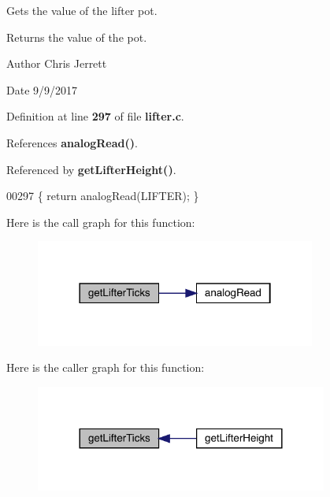 Gets the value of the lifter pot. 

\begin{DoxyReturn}{Returns}
the value of the pot. 
\end{DoxyReturn}
\begin{DoxyAuthor}{Author}
Chris Jerrett 
\end{DoxyAuthor}
\begin{DoxyDate}{Date}
9/9/2017 
\end{DoxyDate}


Definition at line \textbf{ 297} of file \textbf{ lifter.\+c}.



References \textbf{ analog\+Read()}.



Referenced by \textbf{ get\+Lifter\+Height()}.


\begin{DoxyCode}
00297 \{ \textcolor{keywordflow}{return} analogRead(LIFTER); \}
\end{DoxyCode}
Here is the call graph for this function\+:
\nopagebreak
\begin{figure}[H]
\begin{center}
\leavevmode
\includegraphics[width=261pt]{lifter_8h_acdf909159b0406c48099843f2306be78_cgraph}
\end{center}
\end{figure}
Here is the caller graph for this function\+:
\nopagebreak
\begin{figure}[H]
\begin{center}
\leavevmode
\includegraphics[width=272pt]{lifter_8h_acdf909159b0406c48099843f2306be78_icgraph}
\end{center}
\end{figure}
\mbox{\label{lifter_8h_a3738d33dc870f98243a93bddd855b43e}} 

